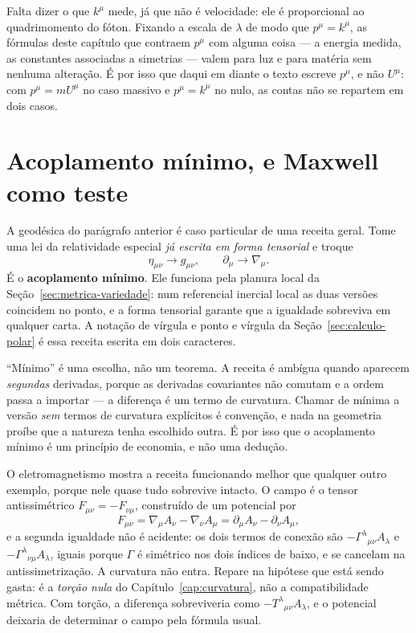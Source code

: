\documentclass[12pt,a4paper,oneside]{book}
\theoremstyle{rgplain}
\theoremstyle{rgremark}
\begin{document}
Falta dizer o que $k^\mu$ mede, já que não é velocidade: ele é proporcional ao
quadrimomento do fóton. Fixando a escala de $\lambda$ de modo que
$p^\mu=k^\mu$, as fórmulas deste capítulo que contraem $p^\mu$ com alguma
coisa --- a energia medida, as constantes associadas a simetrias --- valem
para luz e para matéria sem nenhuma alteração. É por isso que daqui em diante
o texto escreve $p^\mu$, e não $U^\mu$: com $p^\mu=mU^\mu$ no caso massivo e
$p^\mu=k^\mu$ no nulo, as contas não se repartem em dois casos.

\section{Acoplamento mínimo, e Maxwell como teste}
\label{sec:acoplamento-minimo}

A geodésica do parágrafo anterior é caso particular de uma receita geral. Tome uma
lei da relatividade especial \emph{já escrita em forma tensorial} e troque
\[
  \eta_{\mu\nu}\to g_{\mu\nu} ,
  \qquad
  \partial_\mu\to\nabla_\mu .
\]
É o \textbf{acoplamento mínimo}. Ele funciona pela planura local da
Seção~\ref{sec:metrica-variedade}: num referencial inercial local as duas
versões coincidem no ponto, e a forma tensorial garante que a igualdade
sobreviva em qualquer carta. A notação de vírgula e ponto e vírgula da
Seção~\ref{sec:calculo-polar} é essa receita escrita em dois caracteres.

\begin{atencao}
``Mínimo'' é uma escolha, não um teorema. A receita é ambígua quando aparecem
\emph{segundas} derivadas, porque as derivadas covariantes não comutam e a
ordem passa a
importar --- a diferença é um termo de curvatura. Chamar de mínima a versão
\emph{sem} termos de curvatura explícitos é convenção, e nada na geometria
proíbe que a natureza tenha escolhido outra. É por isso que o acoplamento
mínimo é um princípio de economia, e não uma dedução.
\end{atencao}

O eletromagnetismo mostra a receita funcionando melhor que qualquer outro
exemplo, porque nele quase tudo sobrevive intacto. O campo é o tensor antissimétrico
$F_{\mu\nu}=-F_{\nu\mu}$, construído de um potencial por
\begin{equation}
  F_{\mu\nu}=\nabla_\mu A_\nu-\nabla_\nu A_\mu
  =\partial_\mu A_\nu-\partial_\nu A_\mu ,
  \label{eq:faraday}
\end{equation}
e a segunda igualdade não é acidente: os dois termos de conexão são
$-\Gamma^\lambda{}_{\mu\nu}A_\lambda$ e $-\Gamma^\lambda{}_{\nu\mu}A_\lambda$,
iguais porque $\Gamma$ é simétrico nos dois índices de baixo, e se cancelam na
antissimetrização. A curvatura não entra. Repare na hipótese que está sendo
gasta: é a \emph{torção nula} do Capítulo~\ref{cap:curvatura}, não a
compatibilidade métrica. Com torção, a diferença sobreviveria como
$-T^\lambda{}_{\mu\nu}A_\lambda$, e o potencial deixaria de determinar o campo
pela fórmula usual.
\end{document}
